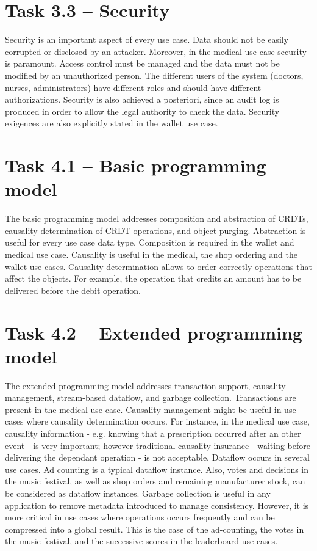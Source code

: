 \documentclass[11pt,a4paper]{report}
\begin{document}
\section{Task 3.3  --  Security}
Security is an important aspect of every use case. Data should not be easily corrupted or disclosed by an attacker. Moreover, in the medical use case security is paramount. Access control must be managed and the data must not be modified by an unauthorized person. The different users of the system (doctors, nurses, administrators) have different roles and should have different authorizations. Security is also achieved a posteriori, since an audit log is produced in order to allow the legal authority to check the data.
Security exigences are also explicitly stated in the wallet use case.  
\section{Task 4.1 --   Basic programming model}
The basic programming model addresses composition and abstraction of CRDTs, causality determination of CRDT operations, and object purging. Abstraction is useful for every use case data type. Composition is required in the wallet and medical use case. Causality is useful in the medical, the shop ordering and the wallet use cases. Causality determination allows to order correctly operations that affect the objects. For example, the operation that credits an amount has to be delivered before the debit operation.
\section{Task 4.2 --   Extended programming model}
The extended programming model addresses transaction support, causality management, stream-based dataﬂow, and garbage collection. 
Transactions are present in the medical use case. Causality management might be useful in use cases where causality determination occurs. For instance, in the medical use case, causality information - e.g. knowing that a prescription occurred after an other event - is very important; however traditional causality insurance - waiting before delivering the dependant operation - is not acceptable.        
Dataflow occurs in several use cases. Ad counting is a typical dataflow instance. Also, votes and decisions in the music festival, as well as shop orders and remaining manufacturer stock, can be considered as dataflow instances. 
Garbage collection is useful in any application to remove metadata introduced to manage consistency. However, it is more critical in use cases where operations occurs frequently and can be compressed into a global result. This is the case of the ad-counting, the votes in the music festival, and the successive scores in the leaderboard use cases.  
\end{document}
